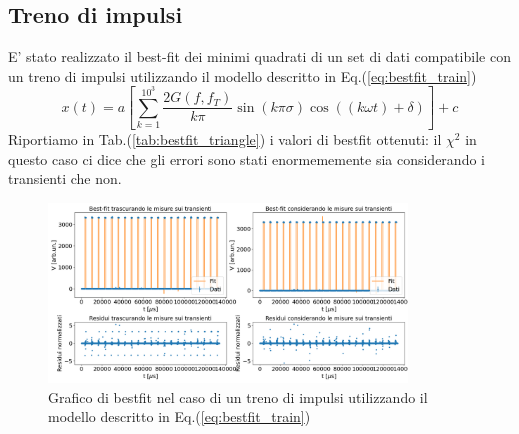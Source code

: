 \documentclass{article}
\begin{document}
    \subsection{Treno di impulsi}
        E' stato realizzato il best-fit dei minimi quadrati
        di un set di dati compatibile con un treno di impulsi utilizzando il modello descritto in Eq.(\ref{eq:bestfit_train})
        \begin{equation}
            x(t) = a \left[\sum_{k=1}^{10^3} \frac{2 G(f, f_T)}{k\pi} \sin{\left( k \pi \sigma \right)} \cos{\left((k \omega t) + \delta\right)}\right] + c
        \label{eq:bestfit_train}
        \end{equation}
        Riportiamo in Tab.(\ref{tab:bestfit_triangle}) i valori di bestfit ottenuti: il $\chi^2$ in questo caso ci dice che gli errori sono stati enormememente sia considerando i transienti che non.
            \begin{figure}[H]            
                \centering
                \includegraphics[width=0.85\textwidth]{bestfit_train.png} %
                \caption{Grafico di bestfit nel caso di un treno di impulsi utilizzando il modello descritto in Eq.(\ref{eq:bestfit_train})
                }
                \label{fig:bestfit_train}
            \end{figure}    
\end{document}
